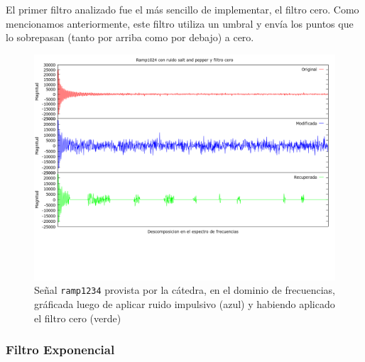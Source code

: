 El primer filtro analizado fue el m\'as sencillo de implementar, el filtro cero.
Como mencionamos anteriormente, este filtro utiliza un umbral y env\'ia los
puntos que lo sobrepasan (tanto por arriba como por debajo) a cero.

\begin{figure}[H]
\begin {center}
\includegraphics[width=500pt]{imagenes/ramp1234-imp-zero.png}
\end {center}
\caption{Se\~nal \texttt{ramp1234} provista por la c\'atedra, en el dominio de frecuencias, gr\'aficada
luego de aplicar ruido impulsivo (azul) y habiendo aplicado el filtro cero (verde)}
\label{fig:Dopp1024zero}
\end{figure}


\subsubsection{Filtro Exponencial}



